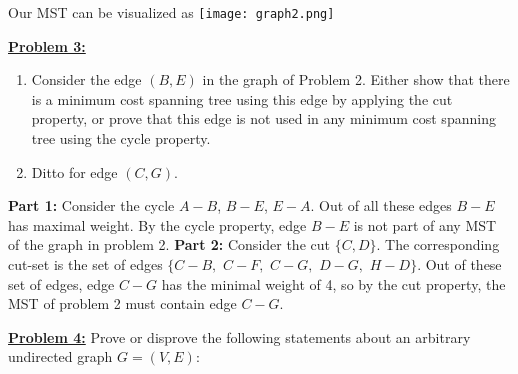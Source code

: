 \documentclass[11pt]{article}
\begin{document}
\begin{flushleft}
\begin{tabular}{ | p{2cm} | p{2cm} | p{5cm} | }
	\end{tabular}
	\newline
	\newline
	Our MST can be visualized as \newline
	\texttt{[image: graph2.png]}
	\newline
	\item\textbf{\underline{Problem 3:}} \begin{enumerate}
		\item
		Consider the edge $(B,E)$ in the graph of Problem 2.
		Either show that there is a minimum cost spanning tree using
		this edge by applying the cut property, or
		prove that this edge is not used in any minimum cost
		spanning tree using the cycle property.
		\item
		Ditto for edge $(C,G)$.
	\end{enumerate}
	\textbf{Part 1: }Consider the cycle $A - B$, $B - E$, $E - A$. Out of all these edges $B - E$ has maximal weight. By the cycle property, edge $B - E$ is not part of any MST of the graph in problem 2. 
	\newline
	\newline
	\textbf{Part 2:} Consider the cut $\lbrace C, D \rbrace$. The corresponding cut-set is the set of edges \newline $\lbrace$$C - B,$ $C - F,$ $C - G,$ $D - G,$ $H - D \rbrace$. Out of these set of edges, edge $C - G$ has the minimal weight of 4, so by the cut property, the MST of problem 2 must contain edge $C - G$. 
	\newline
	\newpage
	\item\textbf{\underline{Problem 4:}} Prove or disprove the following statements about an
	arbitrary undirected graph $G=(V,E)$:
	


\end{flushleft}
\end{document}
